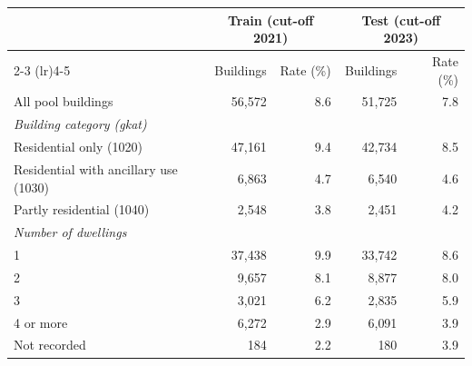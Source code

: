 \begin{tabular}{p{3.6cm}rrrr}
\toprule
 & \multicolumn{2}{c}{Train (cut-off 2021)} & \multicolumn{2}{c}{Test (cut-off 2023)} \\
\cmidrule(lr){2-3} \cmidrule(lr){4-5}
 & Buildings & Rate (\%) & Buildings & Rate (\%) \\
\midrule
All pool buildings & 56{,}572 & 8.6 & 51{,}725 & 7.8 \\
\midrule
\multicolumn{5}{l}{\textit{Building category (gkat)}} \\
Residential only (1020) & 47{,}161 & 9.4 & 42{,}734 & 8.5 \\
Residential with ancillary use (1030) & 6{,}863 & 4.7 & 6{,}540 & 4.6 \\
Partly residential (1040) & 2{,}548 & 3.8 & 2{,}451 & 4.2 \\
\multicolumn{5}{l}{\textit{Number of dwellings}} \\
1 & 37{,}438 & 9.9 & 33{,}742 & 8.6 \\
2 & 9{,}657 & 8.1 & 8{,}877 & 8.0 \\
3 & 3{,}021 & 6.2 & 2{,}835 & 5.9 \\
4 or more & 6{,}272 & 2.9 & 6{,}091 & 3.9 \\
Not recorded & 184 & 2.2 & 180 & 3.9 \\
\bottomrule
\end{tabular}
